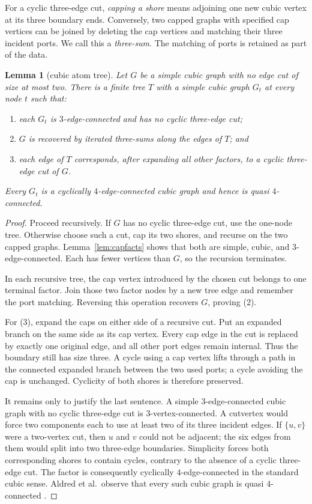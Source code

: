 \documentclass[11pt]{article}
\newtheorem{lemma}[theorem]{Lemma}
\theoremstyle{definition}
\theoremstyle{remark}
\begin{document}
For a cyclic three-edge cut, \emph{capping a shore} means adjoining one
new cubic vertex at its three boundary ends.  Conversely, two capped
graphs with specified cap vertices can be joined by deleting the cap
vertices and matching their three incident ports.  We call this a
\emph{three-sum}.  The matching of ports is retained as part of the
data.

\begin{lemma}[cubic atom tree]\label{lem:atoms}
Let \(G\) be a simple cubic graph with no edge cut of size at most two.
There is a finite tree \(T\) with a simple cubic graph \(G_t\) at every
node \(t\) such that:
\begin{enumerate}
  \item each \(G_t\) is \(3\)-edge-connected and has no cyclic
        three-edge cut;
  \item \(G\) is recovered by iterated three-sums along the edges of
        \(T\); and
  \item each edge of \(T\) corresponds, after expanding all other
        factors, to a cyclic three-edge cut of \(G\).
\end{enumerate}
Every \(G_t\) is a cyclically \(4\)-edge-connected cubic graph and hence
is quasi \(4\)-connected.
\end{lemma}

\begin{proof}
Proceed recursively.  If \(G\) has no cyclic three-edge cut, use the
one-node tree.  Otherwise choose such a cut, cap its two shores, and
recurse on the two capped graphs.  Lemma~\ref{lem:capfacts} shows that
both are simple, cubic, and \(3\)-edge-connected.  Each has fewer
vertices than \(G\), so the recursion terminates.

In each recursive tree, the cap vertex introduced by the chosen cut
belongs to one terminal factor.  Join those two factor nodes by a new
tree edge and remember the port matching.  Reversing this operation
recovers \(G\), proving (2).

For (3), expand the caps on either side of a recursive cut.  Put an
expanded branch on the same side as its cap vertex.  Every cap edge in
the cut is replaced by exactly one original edge, and all other port
edges remain internal.  Thus the boundary still has size three.
A cycle using a cap vertex lifts through a path in the connected
expanded branch between the two used ports; a cycle avoiding the cap
is unchanged.  Cyclicity of both shores is therefore preserved.

It remains only to justify the last sentence.  A simple
\(3\)-edge-connected cubic graph with no cyclic three-edge cut is
\(3\)-vertex-connected.  A cutvertex would force two components each
to use at least two of its three incident edges.  If \(\{u,v\}\) were
a two-vertex cut, then \(u\) and \(v\) could not be adjacent; the six
edges from them would split into two three-edge boundaries.  Simplicity
forces both corresponding shores to contain cycles, contrary to the
absence of a cyclic three-edge cut.  The factor is consequently
cyclically \(4\)-edge-connected in the standard cubic sense.  Aldred
et al.\ observe that every such cubic graph is quasi
\(4\)-connected \cite{aldred1997}.
\end{proof}
\end{document}
